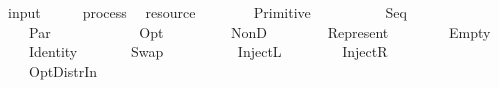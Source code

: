 \isamarkupfalse%
\ input\ {\isacharcolon}{\isacharcolon}\ {\isachardoublequoteopen}{\isacharparenleft}\ \ \ \ process\ {\isasymRightarrow}\isanewline
{}\ resource{\isachardoublequoteclose}\isanewline
\ \ \isanewline
\ \ \ \ {\isachardoublequoteopen}\ {\isacharparenleft}Primitive\ \ \ \ \ {\isacharequal}\ \isanewline
\ \ {\isacharbar}\ {\isachardoublequoteopen}\ {\isacharparenleft}Seq\ \ \ {\isacharequal}\ \ \isanewline
\ \ {\isacharbar}\ {\isachardoublequoteopen}\ {\isacharparenleft}Par\ \ \ {\isacharequal}\ \ \ {\isasymodot}\ \ \isanewline
\ \ {\isacharbar}\ {\isachardoublequoteopen}\ {\isacharparenleft}Opt\ \ \ {\isacharequal}\isanewline
\ \ \ \ \ \ NonD\ {\isacharparenleft}\ \ {\isacharparenleft}\ \isanewline
\ \ {\isacharbar}\ {\isachardoublequoteopen}\ {\isacharparenleft}Represent\ \ {\isacharequal}\isanewline
\ \ \ \ \ \ Empty{\isachardoublequoteclose}\isanewline
\ \ {\isacharbar}\ {\isachardoublequoteopen}\ {\isacharparenleft}Identity\ \ {\isacharequal}\ \isanewline
\ \ {\isacharbar}\ {\isachardoublequoteopen}\ {\isacharparenleft}Swap\ \ \ {\isacharequal}\ \ {\isasymodot}\ \isanewline
\ \ {\isacharbar}\ {\isachardoublequoteopen}\ {\isacharparenleft}InjectL\ \ \ {\isacharequal}\ \isanewline
\ \ {\isacharbar}\ {\isachardoublequoteopen}\ {\isacharparenleft}InjectR\ \ \ {\isacharequal}\ \isanewline
\ \ {\isacharbar}\ {\isachardoublequoteopen}\ {\isacharparenleft}OptDistrIn\ \ \ \ {\isacharequal}\isanewline
